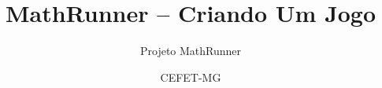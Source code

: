 \documentclass[fleqn,utf8,aspectratio=169,12pt]{beamer}
\title{MathRunner -- Criando Um Jogo}
\author{Projeto MathRunner}
\date{CEFET-MG}
\begin{document}
\begin{frame}
  \titlepage
\end{frame}










\begin{frame}
  \titlepage
\end{frame}

\end{document}
